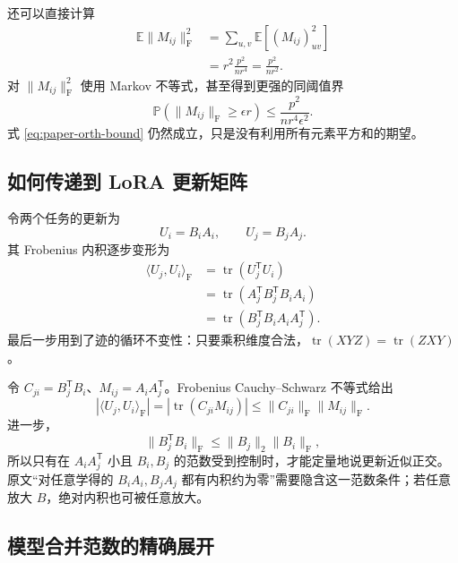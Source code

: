 \documentclass[11pt]{article}
\numberwithin{equation}{section}
\newcommand{\E}{\mathbb{E}}
\newcommand{\Pp}{\mathbb{P}}
\newcommand{\1}{\mathbf{1}}
\newcommand{\F}{\mathrm{F}}
\newcommand{\tr}{\operatorname{tr}}
\begin{document}
还可以直接计算
\begin{align}
  \E\|M_{ij}\|_\F^2
  &=\sum_{u,v}\E[(M_{ij})_{uv}^2]\\
  &=r^2\frac{p^2}{nr^4}
  =\frac{p^2}{nr^2}.
  \label{eq:expected-cross-frob}
\end{align}
对 $\|M_{ij}\|_\F^2$ 使用 Markov 不等式，甚至得到更强的同阈值界
\begin{equation}
  \Pp(\|M_{ij}\|_\F\ge\epsilon r)
  \le\frac{p^2}{nr^4\epsilon^2}.
  \label{eq:stronger-frob-bound}
\end{equation}
式 \eqref{eq:paper-orth-bound} 仍然成立，只是没有利用所有元素平方和的期望。

\subsection{如何传递到 LoRA 更新矩阵}

令两个任务的更新为
\begin{equation}
  U_i=B_iA_i,
  \qquad
  U_j=B_jA_j.
\end{equation}
其 Frobenius 内积逐步变形为
\begin{align}
  \langle U_j,U_i\rangle_\F
  &=\tr(U_j^{\mathsf{T}} U_i)\\
  &=\tr(A_j^{\mathsf{T}} B_j^{\mathsf{T}} B_iA_i)\\
  &=\tr(B_j^{\mathsf{T}} B_iA_iA_j^{\mathsf{T}}).
  \label{eq:update-inner-trace}
\end{align}
最后一步用到了迹的循环不变性：只要乘积维度合法，$\tr(XYZ)=\tr(ZXY)$。

令 $C_{ji}=B_j^{\mathsf{T}} B_i$、$M_{ij}=A_iA_j^{\mathsf{T}}$。Frobenius Cauchy--Schwarz 不等式给出
\begin{equation}
  \boxed{
  |\langle U_j,U_i\rangle_\F|
  =|\tr(C_{ji}M_{ij})|
  \le\|C_{ji}\|_\F\|M_{ij}\|_\F.}
  \label{eq:quantitative-update-orth}
\end{equation}
进一步，
\begin{equation}
  \|B_j^{\mathsf{T}} B_i\|_\F
  \le\|B_j\|_2\|B_i\|_\F,
\end{equation}
所以只有在 $A_iA_j^{\mathsf{T}}$ 小且 $B_i,B_j$ 的范数受到控制时，才能定量地说更新近似正交。原文“对任意学得的 $B_iA_i,B_jA_j$ 都有内积约为零”需要隐含这一范数条件；若任意放大 $B$，绝对内积也可被任意放大。

\subsection{模型合并范数的精确展开}
\end{document}
